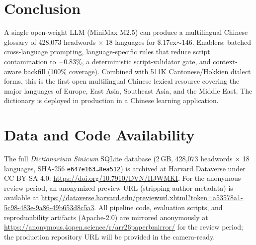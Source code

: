 \documentclass[11pt]{article}
\begin{document}
\section{Conclusion}
\label{sec:conclusion}

A single open-weight LLM (MiniMax M2.5) can produce a multilingual Chinese glossary of 428,073 headwords $\times$ 18 languages for \${\raise.17ex\hbox{$\scriptstyle\sim$}}146. Enablers: batched cross-language prompting, language-specific rules that reduce script contamination to $\sim$0.83\%, a deterministic script-validator gate, and context-aware backfill (100\% coverage). Combined with 511K Cantonese/Hokkien dialect forms, this is the first open multilingual Chinese lexical resource covering the major languages of Europe, East Asia, Southeast Asia, and the Middle East. The dictionary is deployed in production in a Chinese learning application.

\section*{Data and Code Availability}
\label{sec:availability}
The full \textit{Dictionarium Sinicum} SQLite database (2\,GB, 428{,}073 headwords $\times$ 18 languages, SHA-256 \texttt{e647e163\ldots8ea512}) is archived at Harvard Dataverse under CC BY-SA 4.0: \url{https://doi.org/10.7910/DVN/HJWMKI}. For the anonymous review period, an anonymized preview URL (stripping author metadata) is available at \url{https://dataverse.harvard.edu/previewurl.xhtml?token=a53578a1-5c98-483e-9a86-49b653d8c5a3}. All pipeline code, evaluation scripts, and reproducibility artifacts (Apache-2.0) are mirrored anonymously at \url{https://anonymous.4open.science/r/arr26paperbmirror/} for the review period; the production repository URL will be provided in the camera-ready.


\end{document}
